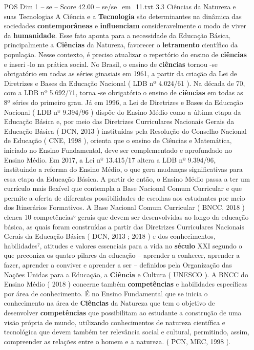 \begin{textsample}{POS Dim 1 – se – Score 42.00 – se/se\_em\_11.txt}  \label{ex:f1_pos_087}
3.3 Ciências da Natureza e suas Tecnologias A Ciência e a \textbf{Tecnologia} são determinantes na dinâmica das sociedades \textbf{contemporâneas} e \textbf{influenciam} consideravelmente o modo de viver da \textbf{humanidade}.
Esse fato aponta para a necessidade da Educação Básica, principalmente a \textbf{Ciências} da Natureza, favorecer o \textbf{letramento} científico da população.
Nesse contexto, é preciso atualizar o repertório do ensino de \textbf{ciências} e inseri -lo na prática social.
No Brasil, o ensino de \textbf{ciências} tornou -se obrigatório em todas as séries ginasiais em 1961, a partir da criação da Lei de Diretrizes e Bases da Educação Nacional ( LDB nº 4.024/61 ).
Na década de 70, com a LDB nº 5.692/71, torna -se obrigatório o ensino de \textbf{ciências} em todas as 8º séries do primeiro grau.
Já em 1996, a Lei de Diretrizes e Bases da Educação Nacional ( LDB nº 9.394/96 ) dispõe do Ensino Médio como a última etapa da Educação Básica e, por meio das Diretrizes Curriculares Nacionais Gerais da Educação Básica ( DCN, 2013 ) instituídas pela Resolução do Conselho Nacional de Educação ( CNE, 1998 ), orienta que o ensino de Ciências e Matemática, iniciado no Ensino Fundamental, deve ser complementado e aprofundado no Ensino Médio.
Em 2017, a Lei nº 13.415/17 altera a LDB nº 9.394/96, instituindo a reforma do Ensino Médio, o que gera mudanças significativas para essa etapa da Educação Básica.
A partir de então, o Ensino Médio passa a ter um currículo mais flexível que contempla a Base Nacional Comum Curricular e que permite a oferta de diferentes possibilidades de escolhas aos estudantes por meio dos Itinerários Formativos.
A Base Nacional Comum Curricular ( BNCC, 2018 ) elenca 10 competências⁶ gerais que devem ser desenvolvidas ao longo da educação básica, as quais foram construídas a partir das Diretrizes Curriculares Nacionais Gerais da Educação Básica ( DCN, 2013 ; 2018 ) e dos conhecimentos, habilidades⁷, atitudes e valores essenciais para a vida no \textbf{século} XXI segundo o que preconiza os quatro pilares da educação – aprender a conhecer, aprender a fazer, aprender a conviver e aprender a ser – definidos pela Organização das Nações Unidas para a Educação, a \textbf{Ciência} e Cultura ( UNESCO ).
A BNCC do Ensino Médio ( 2018 ) concerne também \textbf{competências} e habilidades específicas por área de conhecimento.
É no Ensino Fundamental que se inicia o conhecimento na área de \textbf{Ciências} da Natureza que tem o objetivo de desenvolver \textbf{competências} que possibilitam ao estudante a construção de uma visão própria de mundo, utilizando conhecimentos de natureza científica e tecnológica que devem também ter relevância social e cultural, permitindo, assim, compreender as relações entre o homem e a natureza. ( PCN, MEC, 1998 ).

\end{textsample}
